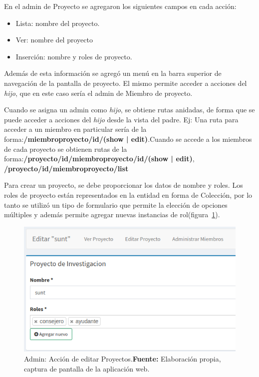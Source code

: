 \documentclass{article}
\begin{document}
En el admin de Proyecto se agregaron los siguientes campos en cada acción:

\begin{itemize}
    \item Lista: nombre del proyecto.
    \item Ver: nombre del proyecto
    \item Inserción: nombre y roles de proyecto.
\end{itemize}

Además de esta información se agregó un menú en la barra superior de navegación de la pantalla de proyecto. El mismo permite acceder a acciones del \textit{hijo},
que en este caso sería el admin de Miembro de proyecto.

Cuando se asigna un admin como \textit{hijo}, se obtiene rutas anidadas, de forma que se puede acceder a acciones del \textit{hijo} desde la vista del padre. Ej: Una ruta
para acceder a un miembro en particular sería de la forma:\newline \textbf{/miembroproyecto/{id}/(show | edit)}\@.\newline\newline Cuando se accede a los miembros de cada proyecto se obtienen rutas de la forma:\newline \textbf{/proyecto/{id}/miembroproyecto/{id}/(show | edit)},
\newline \textbf{/proyecto/{id}/miembroproyecto/list}\newline

Para crear un proyecto, se debe proporcionar los datos de nombre y roles. Los roles de proyecto están representados en la entidad en forma de Colección,
por lo tanto se utilizó un tipo de formulario que permite la elección de opciones múltiples y además permite agregar nuevas instancias de
rol(figura~\ref{fig:image/proyecto-editar}).

\begin{figure}[h]
    \includegraphics[width=1\linewidth]{image/proyecto-editar.png}
    \caption{Admin: Acción de  editar Proyectos.\newline \textbf{Fuente:} Elaboración propia, captura de pantalla de la aplicación web.}
    \label{fig:image/proyecto-editar}
\end{figure}
\end{document}
